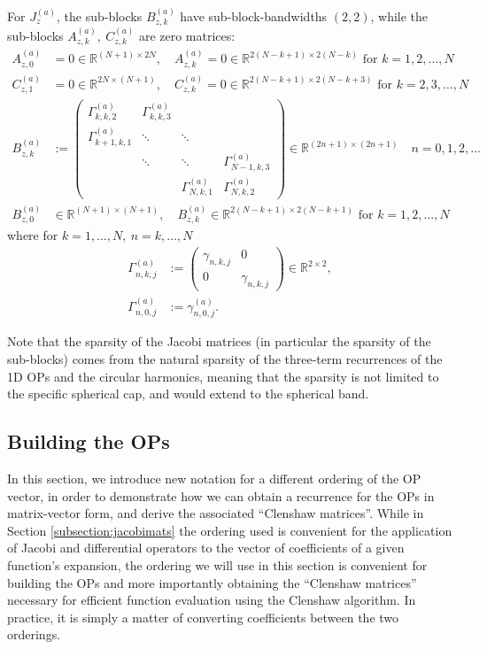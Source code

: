 \documentclass[11pt, oneside]{article}   	%
\newcommand{\R}{\mathbb{R}}
\newcommand{\gammaa}{\gamma^{(a)}}
\begin{document}
For $J_z^{(a)}$, the sub-blocks $B^{(a)}_{z,k}$ have sub-block-bandwidths $(2,2)$, while the sub-blocks $A^{(a)}_{z,k}, \: C^{(a)}_{z,k}$ are zero matrices:
\begin{align*}
	A^{(a)}_{z,0} &= 0 \in \R^{(N+1)\times2N}, \quad A^{(a)}_{z,k} = 0 \in \R^{2(N-k+1)\times2(N-k)} \text{ for } k = 1,2,\dots,N \\
	C^{(a)}_{z,1} &= 0 \in \R^{2N\times(N+1)}, \quad C^{(a)}_{z,k} = 0 \in \R^{2(N-k+1)\times2(N-k+3)} \text{ for } k = 2,3,\dots,N \\
	B^{(a)}_{z,k} &:= 
		\begin{pmatrix}
			\Gamma^{(a)}_{k,k,2} & \Gamma^{(a)}_{k,k,3} & \\
			\Gamma^{(a)}_{k+1,k,1} & \ddots & \ddots & \\
			& \ddots & \ddots & \Gamma^{(a)}_{N-1,k,3} \\
			& & \Gamma^{(a)}_{N,k,1} & \Gamma^{(a)}_{N,k,2}
		\end{pmatrix} \in \R^{(2n+1)\times(2n+1)}  \quad n = 0,1,2,\dots \\
	B^{(a)}_{z,0} &\in \R^{(N+1)\times(N+1)}, \quad B^{(a)}_{z,k} \in \R^{2(N-k+1)\times2(N-k+1)} \text{ for } k = 1,2,\dots,N
\end{align*}
where for $k = 1,\dots,N, \: n = k,\dots,N$
\begin{align}
	\Gamma^{(a)}_{n,k,j} &:= 
		\begin{pmatrix}
			\gamma_{n,k,j} & 0 \\
			0 & \gamma_{n,k,j}
		\end{pmatrix} \in \R^{2\times2}, \label{eqn:jacobisubblocksGamma1} \\
	\Gamma^{(a)}_{n,0,j} &:= \gammaa_{n,0,j}. \label{eqn:jacobisubblocksGamma2}
\end{align}

Note that the sparsity of the Jacobi matrices (in particular the sparsity of the sub-blocks) comes from the natural sparsity of the three-term recurrences of the 1D OPs and the circular harmonics, meaning that the sparsity is not limited to the specific spherical cap, and would extend to the spherical band.




\subsection{Building the OPs} 

In this section, we introduce new notation for a different ordering of the OP vector, in order to demonstrate how we can obtain a recurrence for the OPs in matrix-vector form, and derive the associated \enquote{Clenshaw matrices}. While in Section \ref{subsection:jacobimats} the ordering used is convenient for the application of Jacobi and differential operators to the vector of coefficients of a given function's expansion, the ordering we will use in this section is convenient for building the OPs and more importantly obtaining the \enquote{Clenshaw matrices} necessary for efficient function evaluation using the Clenshaw algorithm. In practice, it is simply a matter of converting coefficients between the two orderings.
\end{document}
